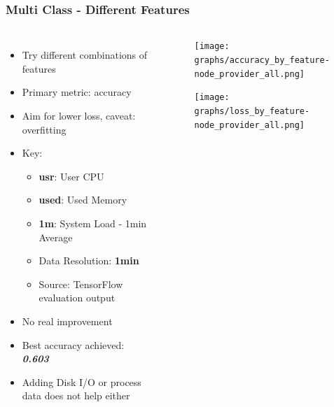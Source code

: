 \documentclass[aspectratio=169,11pt,hyperref={colorlinks=true}]{beamer}
\begin{document}
\begin{frame}
    \frametitle{Multi Class - Different Features}
    \begin{columns}
        \begin{itemize}
            \item{Try different combinations of features}
            \item{Primary metric: accuracy}
            \item{Aim for lower loss, caveat: overfitting}
            \item{Key:}
            \begin{itemize}
              \item{\textbf{usr}: User CPU}
              \item{\textbf{used}: Used Memory}
              \item{\textbf{1m}: System Load - 1min Average}
              \item{Data Resolution: \textbf{1min}}
              \item{Source: TensorFlow evaluation output}
            \end{itemize}
            \item{No real improvement}
            \item{Best accuracy achieved: \emph{\textbf{0.603}}}
            \item{Adding Disk I/O or process data does not help either}
        \end{itemize}
        \begin{center}
        \begin{figure}
          \texttt{[image: graphs/accuracy\_by\_feature-node\_provider\_all.png]}
        \end{figure}
        \begin{figure}
          \texttt{[image: graphs/loss\_by\_feature-node\_provider\_all.png]}
        \end{figure}
      \end{center}
  \end{columns}
\end{frame}
\end{document}

